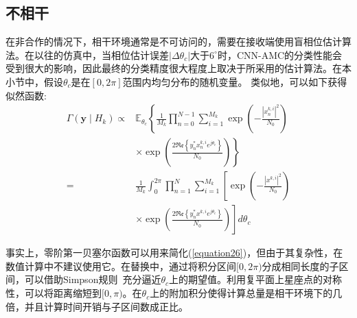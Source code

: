 \documentclass[final]{cvpr}
\begin{document}
\subsection{不相干}\label{incoherent}

在非合作的情况下，相干环境通常是不可访问的，需要在接收端使用盲相位估计算法。在以往的仿真中，当相位估计误差$|\Delta \theta_c|$大于$6^{\circ}$时，CNN-AMC的分类性能会受到很大的影响，因此最终的分类精度很大程度上取决于所采用的估计算法。在本小节中，假设$\theta_c$是在$[0,2\pi]$范围内均匀分布的随机变量。
类似地，可以如下获得似然函数:
\begin{equation}
\begin{aligned}
\Gamma\left(\mathbf{y} \mid H_{k}\right) \propto & \mathbb{E}_{\theta_{c}}\left\{\frac{1}{M_{k}} \prod_{n=0}^{N-1} \sum_{i=1}^{M_{k}} \exp \left(-\frac{\left|x_{n}^{k, i}\right|^{2}}{N_{0}}\right)\right.\\
&\left.\times \exp \left(\frac{2 \Re \mathfrak{e}\left\{y_{n}^{*} x_{n}^{k, i} e^{j \theta_{c}}\right\}}{N_{0}}\right)\right\} \\
=& \frac{1}{M_{k}} \int_{0}^{2 \pi} \prod_{n=1}^{N} \sum_{i=1}^{M_{k}}\left[\exp \left(-\frac{\left|x^{k, i}\right|^{2}}{N_{0}}\right)\right.\\
&\left.\times \exp \left(\frac{2 \Re \mathfrak{e}\left\{y_{n}^{*} x^{k, i} e^{j \theta_{c}}\right\}}{N_{0}}\right)\right] d \theta_{c}
\end{aligned}\label{equation26}
\end{equation}

事实上，零阶第一贝塞尔函数可以用来简化(\ref{equation26})，但由于其复杂性，在数值计算中不建议使用它。在替换中，通过将积分区间$[0,2\pi)$分成相同长度的子区间，可以借助Simpson规则~\cite{r20}充分逼近$\theta_c$上的期望值。利用复平面上星座点的对称性，可以将距离缩短到$[0,\pi)$。在$\theta_c$上的附加积分使得计算总量是相干环境下的几倍，并且计算时间开销与子区间数成正比。
\end{document}
